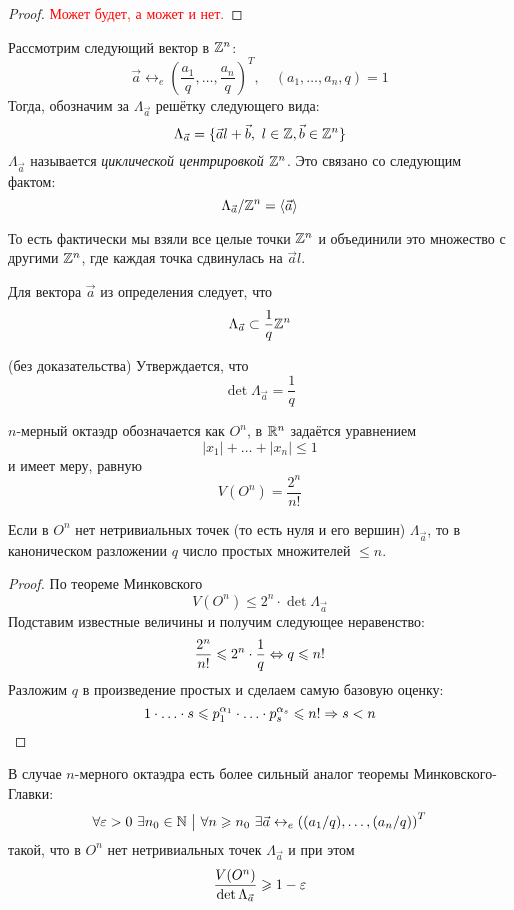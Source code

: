 \begin{proof}
	\textcolor{red}{Может будет, а может и нет.}
\end{proof}

\begin{definition}
	Рассмотрим следующий вектор в $\mathbb{Z}^n$:
	\[
		\vec{a} \leftrightarrow_e \left(\frac{a_1}{q}, \ldots, \frac{a_n}{q}\right)^T,\quad (a_1, \ldots, a_n, q) = 1
	\]
	Тогда, обозначим за $\Lambda_{\vec{a}}$ решётку следующего вида:
	\[
		\Lambda_{\vec{a}} = \{\vec{a}l + \vec{b},\ l \in \mathbb{Z}, \vec{b} \in \mathbb{Z}^n\}
	\]
	$\Lambda_{\vec{a}}$ называется \textit{циклической центрировкой} $\mathbb{Z}^n$. Это связано со следующим фактом:
	\[
		\Lambda_{\vec{a}} / \mathbb{Z}^n = \left\langle \vec{a} \right\rangle
	\]
\end{definition}

\begin{note}
	То есть фактически мы взяли все целые точки $\mathbb{Z}^n$ и объединили это множество с другими $\mathbb{Z}^n$, где каждая точка сдвинулась на $\vec{a}l$.
\end{note}

\begin{proposition}
	Для вектора $\vec{a}$ из определения следует, что
	\[
		\Lambda_{\vec{a}} \subset \frac{1}{q} \mathbb{Z}^n
	\]
\end{proposition}

\begin{theorem} (без доказательства)
	Утверждается, что
	\[
		\det \Lambda_{\vec{a}} = \frac{1}{q}
	\]
\end{theorem}

\begin{reminder}
	$n$-мерный октаэдр обозначается как $O^n$, в $\mathbb{R}^n$ задаётся уравнением
	\[
		|x_1| + \ldots + |x_n| \le 1
	\]
	и имеет меру, равную
	\[
		V(O^n) = \frac{2^n}{n!}
	\]
\end{reminder}

\begin{corollary}
	Если в $O^n$ нет нетривиальных точек (то есть нуля и его вершин) $\Lambda_{\vec{a}}$, то в каноническом разложении $q$ число простых множителей $\le n$.
\end{corollary}

\begin{proof}
	По теореме Минковского
	\[
		V(O^n) \le 2^n \cdot \det \Lambda_{\vec{a}}
	\]
	Подставим известные величины и получим следующее неравенство:
	\[
		\frac{2^n}{n!} \leqslant 2^n \cdot \frac{1}{q} \Leftrightarrow q \leqslant n!
	\]
	Разложим $q$ в произведение простых и сделаем самую базовую оценку:
	\[
		1 \cdot \ldots \cdot s \leqslant p_1^{\alpha_1} \cdot \ldots \cdot p_s^{\alpha_s} \leqslant n! \Rightarrow s < n
	\]
\end{proof}

\begin{theorem}
	В случае $n$-мерного октаэдра есть более сильный аналог теоремы Минковского-Главки:
	\[
		\forall \varepsilon > 0\ \exists n_0 \in \mathbb{N} \ \big|\  \forall n \geqslant n_0\ \exists \vec{a} \leftrightarrow_e \left((a_1/q), \ldots, (a_n/q)\right)^T
	\]
	такой, что в $O^n$ нет нетривиальных точек $\Lambda_{\vec{a}}$ и при этом
	\[
		\frac{V(O^n)}{\det \Lambda_{\vec{a}}} \geqslant 1 - \varepsilon
	\]
\end{theorem}
